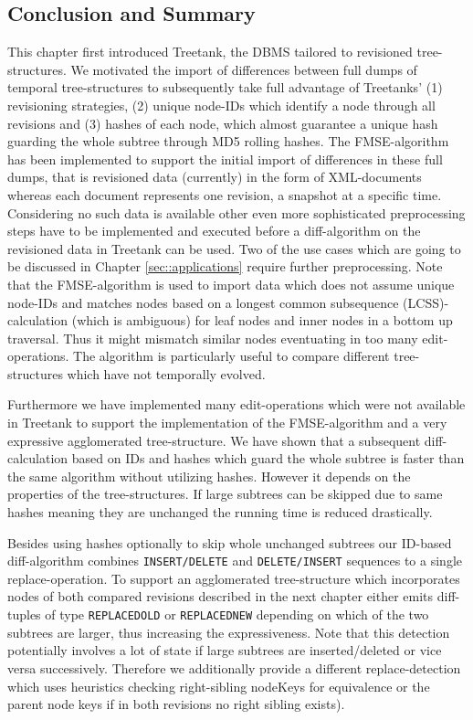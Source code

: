 
\subsection{Conclusion and Summary}
This chapter first introduced Treetank, the DBMS tailored to revisioned tree-structures. We motivated the import of differences between full dumps of temporal tree-structures to subsequently take full advantage of Treetanks' (1) revisioning strategies, (2) unique node-IDs which identify a node through all revisions and (3) hashes of each node, which almost guarantee a unique hash guarding the whole subtree through MD5 rolling hashes. The FMSE-algorithm has been implemented to support the initial import of differences in these full dumps, that is revisioned data (currently) in the form of XML-documents whereas each document represents one revision, a snapshot at a specific time. Considering no such data is available other even more sophisticated preprocessing steps have to be implemented and executed before a diff-algorithm on the revisioned data in Treetank can be used. Two of the use cases which are going to be discussed in Chapter \ref{sec::applications} require further preprocessing. Note that the FMSE-algorithm is used to import data which does not assume unique node-IDs and matches nodes based on a longest common subsequence (LCSS)-calculation (which is ambiguous) for leaf nodes and inner nodes in a bottom up traversal. Thus it might mismatch similar nodes eventuating in too many edit-operations. The algorithm is particularly useful to compare different tree-structures which have not temporally evolved.

Furthermore we have implemented many edit-operations which were not available in Treetank to support the implementation of the FMSE-algorithm and a very expressive agglomerated tree-structure. We have shown that a subsequent diff-calculation based on IDs and hashes which guard the whole subtree is faster than the same algorithm without utilizing hashes. However it depends on the properties of the tree-structures. If large subtrees can be skipped due to same hashes meaning they are unchanged the running time is reduced drastically.

Besides using hashes optionally to skip whole unchanged subtrees our ID-based diff-algorithm combines \texttt{INSERT/DELETE} and \texttt{DELETE/INSERT} sequences to a single replace-operation. To support an agglomerated tree-structure which incorporates nodes of both compared revisions described in the next chapter either emits diff-tuples of type \texttt{REPLACEDOLD} or \texttt{REPLACEDNEW} depending on which of the two subtrees are larger, thus increasing the expressiveness. Note that this detection potentially involves a lot of state if large subtrees are inserted/deleted or vice versa successively. Therefore we additionally provide a different replace-detection which uses heuristics checking right-sibling nodeKeys for equivalence or the parent node keys if in both revisions no right sibling exists).

